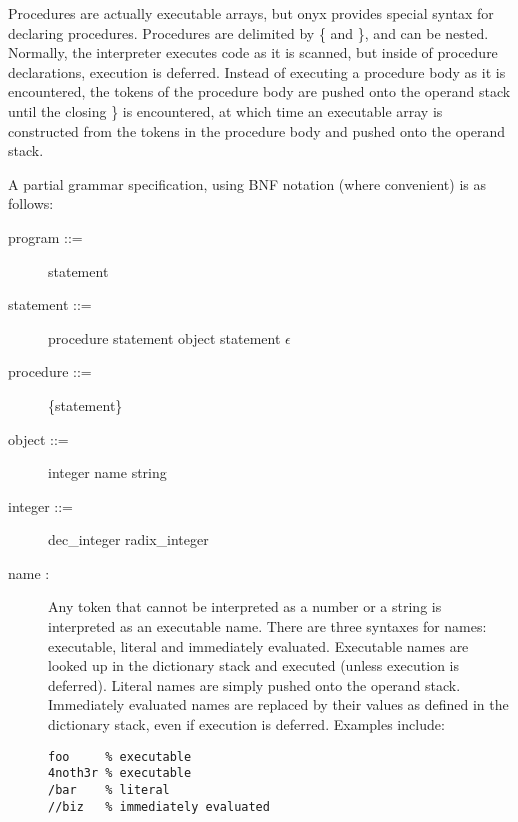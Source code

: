 Procedures are actually executable arrays, but onyx provides special syntax for
declaring procedures.  Procedures are delimited by \{ and \}, and can be
nested.  Normally, the interpreter executes code as it is scanned, but inside of
procedure declarations, execution is deferred.  Instead of executing a procedure
body as it is encountered, the tokens of the procedure body are pushed onto the
operand stack until the closing \} is encountered, at which time an executable
array is constructed from the tokens in the procedure body and pushed onto the
operand stack.

A partial grammar specification, using BNF notation (where convenient) is as
follows:

\begin{description}
\item[{\lt}program{\gt} ::= ] {\lt}statement{\gt}

\item[{\lt}statement{\gt} ::= ] {\lt}procedure{\gt} {\lt}statement{\gt} {\pipe}
{\lt}object{\gt} {\lt}statement{\gt} {\pipe} $\epsilon$

\item[{\lt}procedure{\gt} ::= ] \{{\lt}statement{\gt}\}

\item[{\lt}object{\gt} ::= ] {\lt}integer{\gt} {\pipe} {\lt}name{\gt} {\pipe}
{\lt}string{\gt}

\item[{\lt}integer{\gt} ::= ] {\lt}dec\_integer{\gt} {\pipe}
{\lt}radix\_integer{\gt}

\item[{\lt}name{\gt} : ] Any token that cannot be interpreted as a number or a
string is interpreted as an executable name.  There are three syntaxes for
names: executable, literal and immediately evaluated.  Executable names are
looked up in the dictionary stack and executed (unless execution is deferred).
Literal names are simply pushed onto the operand stack.  Immediately evaluated
names are replaced by their values as defined in the dictionary stack, even if
execution is deferred.  Examples include:
\begin{verbatim}
foo     % executable
4noth3r % executable
/bar    % literal
//biz   % immediately evaluated
\end{verbatim}


\end{description}
